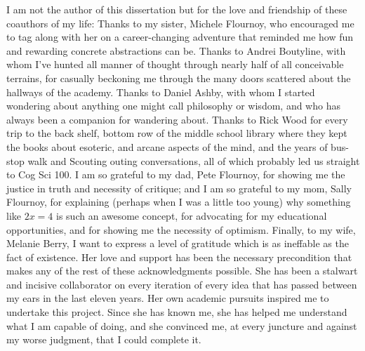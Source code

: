 {I am not the author of this dissertation but for the love and friendship of these coauthors of my life:
Thanks to my sister, Michele Flournoy, who encouraged me to tag along with her on a career-changing adventure that reminded me how fun and rewarding concrete abstractions can be.
Thanks to Andrei Boutyline, with whom I've hunted all manner of thought through nearly half of all conceivable terrains, for casually beckoning me through the many doors scattered about the hallways of the academy.
Thanks to Daniel Ashby, with whom I started wondering about anything one might call philosophy or wisdom, and who has always been a companion for wandering about.
Thanks to Rick Wood for every trip to the back shelf, bottom row of the middle school library where they kept the books about esoteric, and arcane aspects of the mind, and the years of bus-stop walk and Scouting outing conversations, all of which probably led us straight to Cog Sci 100.
I am so grateful to my dad, Pete Flournoy, for showing me the justice in truth and necessity of critique; and I am so grateful to my mom, Sally Flournoy, for explaining (perhaps when I was a little too young) why something like $2x=4$ is such an awesome concept, for advocating for my educational opportunities, and for showing me the necessity of optimism.
Finally, to my wife, Melanie Berry, I want to express a level of gratitude which is as ineffable as the fact of existence.
Her love and support has been the necessary precondition that makes any of the rest of these acknowledgments possible.
She has been a stalwart and incisive collaborator on every iteration of every idea that has passed between my ears in the last eleven years. 
Her own academic pursuits inspired me to undertake this project.
Since she has known me, she has helped me understand what I am capable of doing, and she convinced me, at every juncture and against my worse judgment, that I could complete it.

}
\dedication{
To who you are, and will never be.
To Ozymandias.
But most of all, to my wife, Melanie Berry.
}